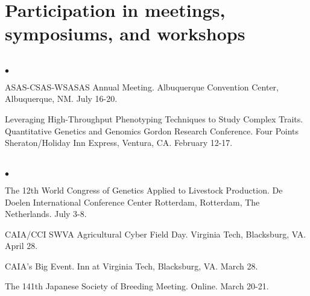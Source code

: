 \documentclass[margin,line,10pt]{res}
\newenvironment{list2}{
  \begin{list}{$\bullet$}{%
      \setlength{\itemsep}{0in}
      \setlength{\parsep}{0in} \setlength{\parskip}{0in}
      \setlength{\topsep}{0in} \setlength{\partopsep}{0in} 
      \setlength{\leftmargin}{0.2in}}}{\end{list}}
\begin{document}
\begin{resume}
\vspace{0.5cm}
\section{\sc Participation in meetings, symposiums, and workshops} 
\vspace{2cm}


\section{}
\begin{list2}

  \item ASAS-CSAS-WSASAS Annual Meeting. Albuquerque Convention Center, Albuquerque, NM. July 16-20.

  \vspace{0.5cm}

  \item Leveraging High-Throughput Phenotyping Techniques to Study Complex Traits. Quantitative Genetics and Genomics Gordon Research Conference. Four Points Sheraton/Holiday Inn Express, Ventura, CA. February 12-17. 

\end{list2}

\section{}
\begin{list2}

\item   The 12th World Congress of Genetics Applied to Livestock Production. De Doelen International Conference Center Rotterdam, Rotterdam, The Netherlands. July 3-8. 

    \vspace{0.5cm}

    
  \item  CAIA/CCI SWVA Agricultural Cyber Field Day. Virginia Tech, Blacksburg, VA. April 28. 

       
  \vspace{0.5cm}

\item  CAIA's Big Event. Inn at Virginia Tech, Blacksburg, VA. March 28. 

       
  \vspace{0.5cm}
  
\item The 141th Japanese Society of Breeding Meeting. Online. March 20-21.  
  

\end{list2}
\end{resume}
\end{document}
